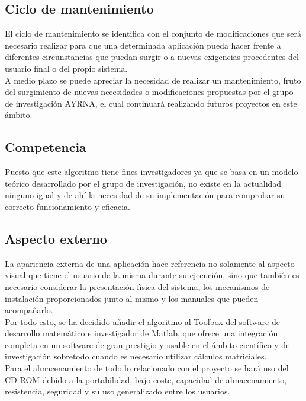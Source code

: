 		\subsection{Ciclo de mantenimiento}
		
			El ciclo de mantenimiento se identifica con el conjunto de modificaciones que será necesario realizar para que una determinada aplicación pueda hacer frente a diferentes circunstancias que puedan surgir o a nuevas exigencias procedentes del usuario final o del propio sistema.\\
		
			A medio plazo se puede apreciar la necesidad de realizar un mantenimiento, fruto del surgimiento de nuevas necesidades o modificaciones propuestas por el grupo de investigación AYRNA, el cual continuará realizando futuros proyectos en este ámbito.
		
		\subsection{Competencia}
		
			Puesto que este algoritmo tiene fines investigadores ya que se basa en un modelo teórico desarrollado por el grupo de investigación, no existe en la actualidad ninguno igual y de ahí la necesidad de su implementación para comprobar su correcto funcionamiento y eficacia.
		
		\subsection{Aspecto externo}
		
			La apariencia externa de una aplicación hace referencia no solamente al aspecto visual que tiene el usuario de la misma durante su ejecución, sino que también es necesario considerar la presentación física del sistema, los mecanismos de instalación proporcionados junto al mismo y los manuales que pueden acompañarlo.\\
		
			Por todo esto, se ha decidido añadir el algoritmo al Toolbox del software de desarrollo matemático e investigador de Matlab, que ofrece una integración completa en un software de gran prestigio y usable en el ámbito científico y de investigación sobretodo cuando es necesario utilizar cálculos matriciales.\\
		
			Para el almacenamiento de todo lo relacionado con el proyecto se hará uso del CD-ROM debido a la portabilidad, bajo coste, capacidad de almacenamiento, resistencia, seguridad y su uso generalizado entre los usuarios.\\
		
